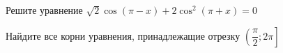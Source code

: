 \begin{ex}
	\begin{condition}
		\begin{enumcols}[label=\asbuk*)]
			\item Решите уравнение \( \sqrt{2}\cos {(\pi-x)} + 2\cos^2{(\pi+x)}=0 \)
			\item Найдите все корни уравнения, принадлежащие отрезку \( \left(\dfrac{\pi}{2};2\pi\right] \)
		\end{enumcols}
	\end{condition}
\end{ex}